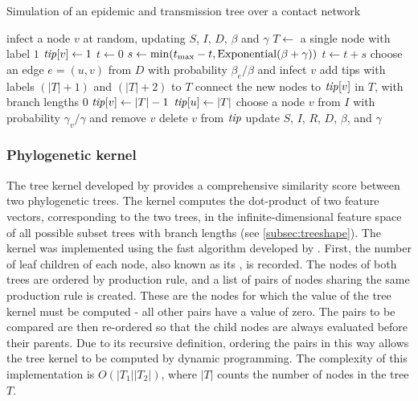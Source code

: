 \begin{algorithm}
  \label{alg:nettree}
  \caption{Simulation of an epidemic and transmission tree over a contact network}
  \begin{algorithmic}
    \State infect a node $v$ at random, updating $S$, $I$, $D$, $\beta$ and $\gamma$
    \State $T \gets$ a single node with label $1$
    \State $\mathit{tip}[v] \gets 1$
    \State $t \gets 0$
      \State $s \gets \min(t_{\max} - t, \operatorname{Exponential}(\beta + \gamma))$
      \EndFor
      \State $t \gets t + s$
          \State choose an edge $e = (u, v)$ from $D$ with probability $\beta_e / \beta$
                 and infect $v$
          \State add tips with labels $(|T|+1)$ and $(|T|+2)$ to $T$
          \State connect the new nodes to $\mathit{tip}[v]$ in $T$, with branch lengths $0$
          \State $\mathit{tip}[v] \gets |T|-1$
          \State $\mathit{tip}[u] \gets |T|$
        \Else
          \State choose a node $v$ from $I$ with probability $\gamma_v / \gamma$
                 and remove $v$
          \State delete $v$ from $\mathit{tip}$
        \EndIf
        \State update $S$, $I$, $R$, $D$, $\beta$, and $\gamma$
      \EndIf
    \EndWhile
  \end{algorithmic}
\end{algorithm}

\subsubsection{Phylogenetic kernel}

The tree kernel developed by \textcite{poon2013mapping} provides a
comprehensive similarity score between two phylogenetic trees. The kernel
computes the dot-product of two feature vectors, corresponding to the two
trees, in the infinite-dimensional feature space of all possible subset trees
with branch lengths (see \cref{subsec:treeshape}). The kernel was implemented
using the fast algorithm developed by \textcite{moschitti2006making}. First,
the number of leaf children of each node, also known as its , is recorded. The nodes of both trees are ordered by production rule, and
a list of pairs of nodes sharing the same production rule is created. These are
the nodes for which the value of the tree kernel must be computed - all other
pairs have a value of zero. The pairs to be compared are then re-ordered so
that the child nodes are always evaluated before their parents. Due to its
recursive definition, ordering the pairs in this way allows the tree kernel to
be computed by dynamic programming. The complexity of this implementation is
$O(|T_1||T_2|)$, where $|T|$ counts the number of nodes in the tree $T$.

